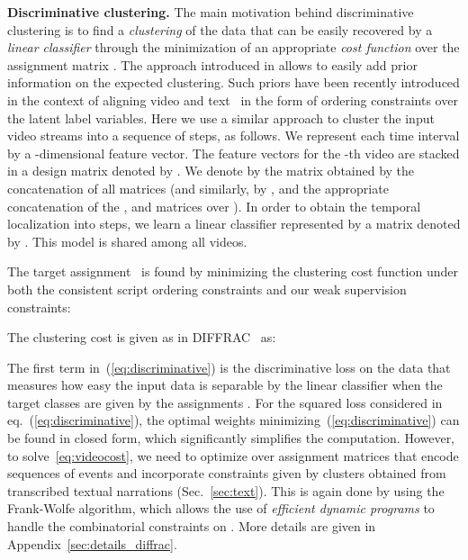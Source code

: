 \documentclass[10pt,twocolumn,letterpaper]{article}
\begin{document}
\textbf{Discriminative clustering.}
The main motivation behind discriminative clustering is to find a \emph{clustering} of the data that can be easily recovered by a \emph{linear classifier} through the minimization of an appropriate \emph{cost function} over the assignment matrix .
The approach introduced in \cite{Bach07diffrac} allows to easily add prior information on the expected clustering.
Such priors have been recently introduced in the context of aligning video and text~\cite{Bojanowski14weakly, Bojanowski15weakly} in the form of ordering constraints over the latent label variables.
Here we use a similar approach to cluster the  input video streams  into a sequence of  steps, as follows.
We represent each time interval by a -dimensional feature vector. 
The feature vectors for the -th video are stacked in a  design matrix denoted by . 
We denote by  the  matrix obtained by the concatenation of all  matrices
(and similarly, by ,  and  the appropriate concatenation of the ,  and  matrices over ). 
In order to obtain the temporal localization into  steps, we learn a linear classifier represented by a  matrix denoted by .
This model is shared among all videos. 


The target assignment~ is found by minimizing the clustering cost function  under 
both the consistent script ordering constraints  and
our weak supervision constraints:

The clustering cost  is given as in DIFFRAC~\cite{Bach07diffrac} as:

The first term in~(\ref{eq:discriminative}) is the discriminative loss on the data that measures how easy the input data  is separable by the linear classifier  when the target classes are given by the assignments .  
For the squared loss considered in eq.~(\ref{eq:discriminative}), the optimal weights  minimizing~(\ref{eq:discriminative}) can be found in closed form, 
which significantly simplifies the computation. 
However, to solve~\eqref{eq:videocost}, we need to optimize over assignment matrices  that encode sequences of events and incorporate constraints given by clusters obtained from transcribed textual narrations (Sec.~\ref{sec:text}). 
This is again done by using the Frank-Wolfe algorithm, which allows the use of \emph{efficient dynamic programs} 
to handle the combinatorial constraints on .
More details are given in Appendix~\ref{sec:details_diffrac}.
\end{document}
